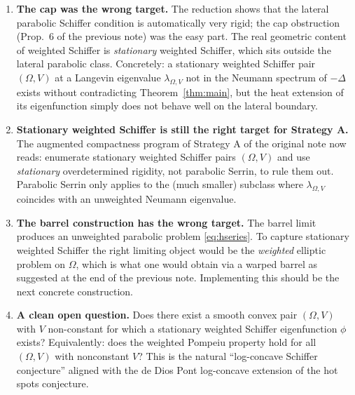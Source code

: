 \documentclass[11pt]{article}
\newcommand{\Om}{\Omega}
\newcommand{\1}{\mathbf 1}
\begin{document}
\begin{enumerate}[leftmargin=*]
    \item \textbf{The cap was the wrong target.} The reduction shows
    that the lateral parabolic Schiffer condition is automatically
    very rigid; the cap obstruction (Prop.~6 of the previous note) was
    the easy part. The real geometric content of weighted Schiffer is
    \emph{stationary} weighted Schiffer, which sits outside the
    lateral parabolic class. Concretely: a stationary weighted
    Schiffer pair $(\Om,V)$ at a Langevin eigenvalue $\lambda_{\Om,V}$
    not in the Neumann spectrum of $-\Delta$ exists without
    contradicting Theorem~\ref{thm:main}, but the heat extension of
    its eigenfunction simply does not behave well on the lateral
    boundary.

    \item \textbf{Stationary weighted Schiffer is still the right
    target for Strategy A.} The augmented compactness program of
    Strategy A of the original note now reads: enumerate stationary
    weighted Schiffer pairs $(\Om,V)$ and use \emph{stationary}
    overdetermined rigidity, not parabolic Serrin, to rule them out.
    Parabolic Serrin only applies to the (much smaller) subclass where
    $\lambda_{\Om,V}$ coincides with an unweighted Neumann eigenvalue.

    \item \textbf{The barrel construction has the wrong target.} The
    barrel limit produces an unweighted parabolic problem
    \eqref{eq:hseries}. To capture stationary weighted Schiffer the
    right limiting object would be the \emph{weighted} elliptic
    problem on $\Om$, which is what one would obtain via a warped
    barrel as suggested at the end of the previous note. Implementing
    this should be the next concrete construction.

    \item \textbf{A clean open question.} Does there exist a smooth
    convex pair $(\Om,V)$ with $V$ non-constant for which a stationary
    weighted Schiffer eigenfunction $\phi$ exists? Equivalently: does
    the weighted Pompeiu property hold for all $(\Om,V)$ with
    nonconstant $V$? This is the natural ``log-concave Schiffer
    conjecture'' aligned with the de Dios Pont log-concave extension
    of the hot spots conjecture.
\end{enumerate}
\end{document}
